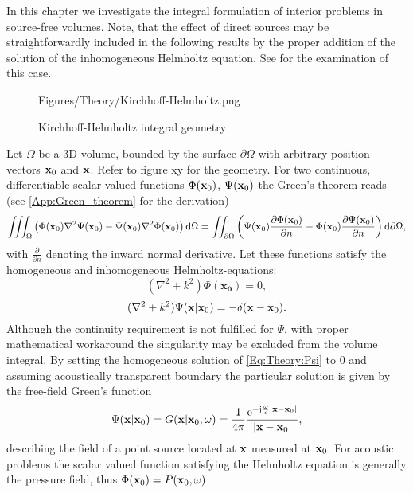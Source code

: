 In this chapter we investigate the integral formulation of interior problems in source-free volumes.
Note, that the effect of direct sources may be straightforwardly included in the following results by the proper addition of the solution of the inhomogeneous Helmholtz equation. See \cite{Spors2005} for the examination of this case.
\begin{figure}[!h]
	\centering
	\begin{overpic}[width = .65\columnwidth]{Figures/Theory/Kirchhoff-Helmholtz.png}
	\end{overpic}
\caption{Kirchhoff-Helmholtz integral geometry}
	\label{Fig:Theory:HIE_geometry}
\end{figure}

Let $\Omega$ be a 3D volume, bounded by the surface $\partial \Omega$ with arbitrary position vectors $\mathbf{x}_0$ and $\mathbf{x}$. Refer to figure xy for the geometry. For two continuous, differentiable scalar valued functions $\Phi(\mathbf{x}_0)$, $\Psi(\mathbf{x}_0)$ the Green's theorem reads (see \ref{App:Green_theorem} for the derivation)
\begin{equation}
\iiint_{\Omega}          \left(  \Phi(\mathbf{x}_0) \nabla^2 \Psi(\mathbf{x}_0) - \Psi(\mathbf{x}_0) \nabla^2 \Phi(\mathbf{x}_0)   \right)   \mathrm{d} \Omega = 
\iint_{\partial \Omega}  \left(  \Psi(\mathbf{x}_0) \frac{\partial \Phi(\mathbf{x}_0)}{\partial n}  - \Phi(\mathbf{x}_0) \frac{\partial \Psi(\mathbf{x}_0)}{\partial n}  \right)   \mathrm{d} \partial \Omega,
\label{Eq:Theory:Greens-theorem}
\end{equation}
with $\frac{\partial}{\partial n}$ denoting the inward normal derivative. Let these functions satisfy the homogeneous and inhomogeneous Helmholtz-equations:
\begin{equation}
(\nabla^2 + k^2)\Phi(\mathbf{x_0}) = 0,
\label{Eq:Theory:Phi}
\end{equation}
\begin{equation}
(\nabla^2 + k^2)\Psi(\mathbf{x}|\mathbf{x}_0) = -\delta(\mathbf{x} - \mathbf{x}_0).
\label{Eq:Theory:Psi}
\end{equation}
Although the continuity requirement is not fulfilled for $\Psi$, with proper mathematical workaround the singularity may be excluded from the volume integral\cite{Williams1999}. By setting the homogeneous solution of \eqref{Eq:Theory:Psi} to 0 and assuming acoustically transparent boundary the particular solution is given by the free-field Green's function
\begin{equation}
\Psi(\mathbf{x} | \mathbf{x}_0) = G(\mathbf{x}| \mathbf{x}_0,\omega) = \frac{1}{4\pi} \frac{\mathrm{e}^{-\mathrm{j} \frac{\omega}{c} |\mathbf{x}-\mathbf{x}_0|}}{|\mathbf{x}-\mathbf{x}_0|},
\end{equation}
describing the field of a point source located at $\mathbf{x}$ measured at $\mathbf{x}_0$. For acoustic problems the scalar valued function satisfying the Helmholtz equation is generally the pressure field, thus $\Phi(\mathbf{x}_0) = P(\mathbf{x}_0,\omega) $
 
